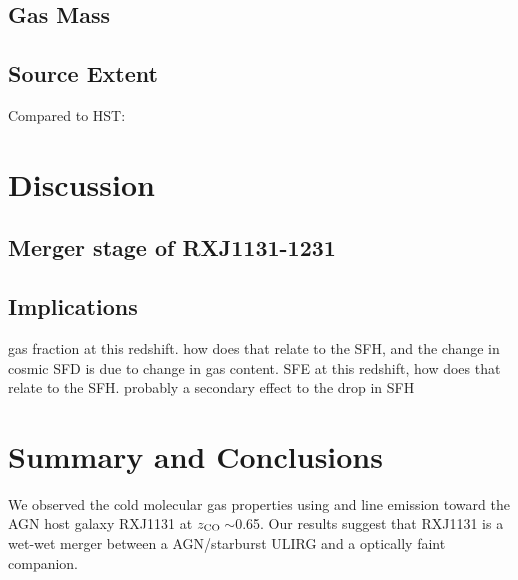 \documentclass[]{emulateapj}
\begin{document}
\subsection{Gas Mass}
\subsection{Source Extent}
Compared to HST:

\section{Discussion}
\subsection{Merger stage of RXJ1131-1231}



\subsection{Implications}
gas fraction at this redshift. how does that relate to
the SFH, and the change in cosmic SFD is due to change in gas content.
SFE at this redshift, how does that relate to the SFH. probably a secondary effect to the drop in SFH


\section{Summary and Conclusions}
We observed the cold molecular gas properties using \bco and \cco line emission
toward the AGN host galaxy RXJ1131 at $z_{\rm CO}$\,$\sim$0.65.
Our results suggest that RXJ1131 is a wet-wet merger between a AGN/starburst
ULIRG and a optically faint companion.






\acknowledgments




\end{document}
